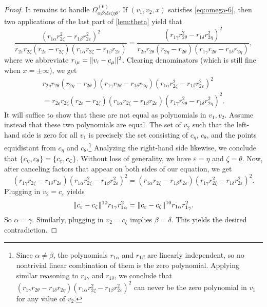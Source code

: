 \documentclass[11pt]{amsart}
\theoremstyle{definition}
\DeclarePairedDelimiter{\set}{\{}{\}}
\DeclarePairedDelimiter{\Abs}{\lVert}{\rVert}
\newcommand{\eps}{\varepsilon}
\begin{document}
\begin{proof}
It remains to handle $\Omega^{(6)}_{\alpha\beta\gamma\delta\eps\zeta\eta\theta}$. If $(v_1,v_2,x)$ satisfies \eqref{eq:omega-6}, then two applications of the last part of \cref{lem:theta} yield that
\[\frac{(r_{1\alpha}r_{2\zeta}^2-r_{1\beta}r_{2\eps}^2)^2}{r_{2\eps}r_{2\zeta}(r_{2\eps}-r_{2\zeta})(r_{1\alpha}r_{2\zeta}-r_{1\beta}r_{2\eps})} = \frac{(r_{1\gamma}r_{2\theta}^2-r_{1\delta}r_{2\eta}^2)^2}{r_{2\eta}r_{2\theta}(r_{2\eta}-r_{2\theta})(r_{1\gamma}r_{2\theta}-r_{1\delta}r_{2\eta})},\]
where we abbreviate $r_{i\mu} = \Abs{v_i - c_\mu}^2$. Clearing denominators (which is still fine when $x = \pm \infty$), we get
\begin{multline*}
r_{2\eta}r_{2\theta}(r_{2\eta}-r_{2\theta})(r_{1\gamma}r_{2\theta}-r_{1\delta}r_{2\eta})(r_{1\alpha}r_{2\zeta}^2-r_{1\beta}r_{2\eps}^2)^2 \\ = r_{2\eps}r_{2\zeta}(r_{2\eps}-r_{2\zeta})(r_{1\alpha}r_{2\zeta}-r_{1\beta}r_{2\eps})(r_{1\gamma}r_{2\theta}^2-r_{1\delta}r_{2\eta}^2)^2.
\end{multline*}
It will suffice to show that these are not equal as polynomials in $v_1,v_2$.  Assume instead that these two polynomials are equal. The set of $v_2$ such that the left-hand side is zero for all $v_1$ is precisely the set consisting of $c_\eta$, $c_\theta$, and the points equidistant from $c_\eta$ and $c_\theta$.\footnote{Since $\alpha \neq \beta$, the polynomials $r_{1\alpha}$ and $r_{1\beta}$ are linearly independent, so no nontrivial linear combination of them is the zero polynomial. Applying similar reasoning to $r_{1\gamma}$ and $r_{1\delta}$, we conclude that $(r_{1\gamma}r_{2\theta}-r_{1\delta}r_{2\eta})(r_{1\alpha}r_{2\zeta}^2-r_{1\beta}r_{2\eps}^2)^2$ can never be the zero polynomial in $v_1$ for any value of $v_2$.} Analyzing the right-hand side likewise, we conclude that $\set{c_\eta, c_\theta} = \set{c_\eps, c_\zeta}$.  Without loss of generality, we have $\eps = \eta$ and $\zeta = \theta$. Now, after canceling factors that appear on both sides of our equation, we get
\[(r_{1\gamma}r_{2\zeta}-r_{1\delta}r_{2\eps})(r_{1\alpha}r_{2\zeta}^2-r_{1\beta}r_{2\eps}^2)^2 = (r_{1\alpha}r_{2\zeta}-r_{1\beta}r_{2\eps})(r_{1\gamma}r_{2\zeta}^2-r_{1\delta}r_{2\eps}^2)^2.\]
Plugging in $v_2 = c_\eps$ yields
\[\Abs{c_\eps - c_\zeta}^{10} r_{1\gamma}r_{1\alpha}^2 = \Abs{c_\eps - c_\zeta}^{10} r_{1\alpha}r_{1\gamma}^2.\]
So $\alpha = \gamma$. Similarly, plugging in $v_2 = c_\zeta$ implies $\beta = \delta$. This yields the desired contradiction.
\end{proof}
\end{document}
